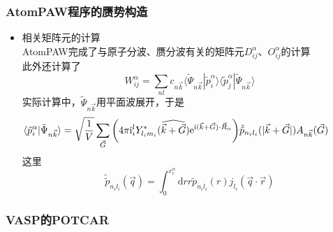 \frame
{
	\frametitle{\textrm{AtomPAW}程序的赝势构造}
	\begin{itemize}
		\item 相关矩阵元的计算\\
			\textrm{AtomPAW}完成了与原子分波、赝分波有关的矩阵元$D_{ij}^{\alpha}$、$O_{ij}^{\alpha}$的计算\\
			此外还计算了
			$$W_{ij}^{\alpha}=\sum_{nl}c_{n\vec k}\langle\tilde\Psi_{n\vec k}|\tilde p_i^\alpha\rangle\langle\tilde p_j^{\alpha}|\tilde\Psi_{n\vec k}\rangle$$
			实际计算中，$\tilde\Psi_{n\vec k}$用平面波展开，于是
			$$\hspace*{-28pt}\langle\tilde p_i^{\alpha}|\tilde\Psi_{n\vec k}\rangle=\sqrt{\dfrac1V}\sum_{\vec G}\bigg(4\pi \mathrm{i}^l_iY^{\ast}_{l_im_i}(\widehat{\vec k+\vec G})\mathrm{e}^{\mathrm{i}(\vec k+\vec G)\cdot\vec R_{\alpha}}\bigg)\tilde{\tilde p}_{n_il_i}(|\vec k+\vec G|)A_{n\vec k}(\vec G)$$
			这里$$\tilde{\tilde p}_{n_il_i}(\vec q)=\int_0^{r_c^{\alpha}}\mathrm{d}rr\tilde p_{n_il_i}(r)j_{l_i}(\vec q\cdot\vec r)$$
	\end{itemize}
}

\frame
{
	\frametitle{\rm{VASP}的\rm{POTCAR}}
\centering
\vspace{-0.15in}
\fontsize{4.8pt}{4.2pt}\selectfont{
}
}

